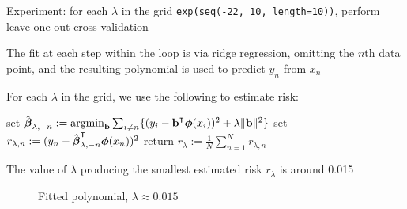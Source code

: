 \begin{frame}

    \vspace{2em}
    Experiment: for each $\lambda$ in the grid
    \texttt{exp(seq(-22, 10, length=10))}, perform leave-one-out cross-validation
    
    \vspace{.7em}
    The
    fit at each step within the loop is via ridge regression, omitting the $n$th
    data point, and the resulting polynomial is used to predict $y_n$ from $x_n$
\end{frame}

\begin{frame}
    \vspace{2em}
    
    For each
    $\lambda$ in the grid, we use the following to estimate risk:

    \vspace{0.5em}
    \begin{algorithmic}[1]
            \State set $\hboldbeta_{\lambda, -n} :=
                \argmin_{\boldb} \sum_{i \not= n} 
                    \{
                        (y_i - \boldb^\T\boldphi(x_i))^2 + \lambda \| \boldb \|^2
                    \}$ 
            \State set $r_{\lambda, n} := (y_n - \hboldbeta_{\lambda, -n}^\T\boldphi(x_n))^2$ 
        \EndFor
        \State return $r_{\lambda} := \frac{1}{N} \sum_{n=1}^N r_{\lambda, n}$
    \end{algorithmic}
    \vspace{0.5em}
    
    The value of $\lambda$ producing the smallest estimated risk $r_{\lambda}$ is
    around 0.015
    
\end{frame}

\begin{frame}

    \begin{figure}
   \begin{center}
    \caption{\label{f:cvbest} Fitted polynomial, $\lambda \approx 0.015$}
   \end{center}
    \end{figure}


\end{frame}
    
    






